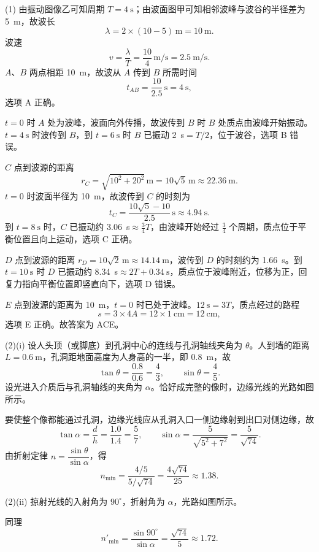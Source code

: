 \begin{answer}
(1) 由振动图像乙可知周期 $T=\SI{4}{\second}$；由波面图甲可知相邻波峰与波谷的半径差为 \SI{5}{\metre}，故波长
\[
  \lambda=2\times(10-5)\,\si{\metre}=\SI{10}{\metre}.
\]
波速
\[
  v=\frac{\lambda}{T}=\frac{10}{4}\,\si{\metre\per\second}=\SI{2.5}{\metre\per\second}.
\]
$A$、$B$ 两点相距 \SI{10}{\metre}，故波从 $A$ 传到 $B$ 所需时间
\[
  t_{AB}=\frac{10}{2.5}\,\si{\second}=\SI{4}{\second},
\]
选项 A 正确。

$t=0$ 时 $A$ 处为波峰，波面向外传播，故波传到 $B$ 时 $B$ 处质点由波峰开始振动。$t=\SI{4}{\second}$ 时波传到 $B$，到 $t=\SI{6}{\second}$ 时 $B$ 已振动 \SI{2}{\second}$=T/2$，位于波谷，选项 B 错误。

$C$ 点到波源的距离
\[
  r_{C}=\sqrt{10^{2}+20^{2}}\,\si{\metre}=10\sqrt{5}\,\si{\metre}\approx\SI{22.36}{\metre}.
\]
$t=0$ 时波面半径为 \SI{10}{\metre}，故波传到 $C$ 的时刻为
\[
  t_{C}=\frac{10\sqrt{5}-10}{2.5}\,\si{\second}\approx\SI{4.94}{\second}.
\]
到 $t=\SI{8}{\second}$ 时，$C$ 已振动约 \SI{3.06}{\second}$\approx\tfrac{3}{4}T$，由波峰开始经过 $\tfrac34$ 个周期，质点位于平衡位置且向上运动，选项 C 正确。

$D$ 点到波源的距离 $r_{D}=10\sqrt{2}\,\si{\metre}\approx\SI{14.14}{\metre}$，波传到 $D$ 的时刻约为 \SI{1.66}{\second}。到 $t=\SI{10}{\second}$ 时 $D$ 已振动约 \SI{8.34}{\second}$\approx2T+\SI{0.34}{\second}$，质点位于波峰附近，位移为正，回复力指向平衡位置即竖直向下，选项 D 错误。

$E$ 点到波源的距离为 \SI{10}{\metre}，$t=0$ 时已处于波峰。$\SI{12}{\second}=3T$，质点经过的路程
\[
  s=3\times4A=12\times\SI{1}{\centi\metre}=\SI{12}{\centi\metre},
\]
选项 E 正确。故答案为 ACE。

(2)(i) 设人头顶（或脚底）到孔洞中心的连线与孔洞轴线夹角为 $\theta$。人到墙的距离 $L=\SI{0.6}{\metre}$，孔洞距地面高度为人身高的一半，即 \SI{0.8}{\metre}，故
\[
  \tan\theta=\frac{0.8}{0.6}=\frac{4}{3},
  \qquad
  \sin\theta=\frac{4}{5}.
\]
设光进入介质后与孔洞轴线的夹角为 $\alpha$。恰好成完整的像时，边缘光线的光路如图所示。


要使整个像都能通过孔洞，边缘光线应从孔洞入口一侧边缘射到出口对侧边缘，故
\[
  \tan\alpha=\frac{d}{h}=\frac{1.0}{1.4}=\frac{5}{7},
  \qquad
  \sin\alpha=\frac{5}{\sqrt{5^{2}+7^{2}}}=\frac{5}{\sqrt{74}}.
\]
由折射定律 $n=\dfrac{\sin\theta}{\sin\alpha}$，得
\[
  n_{\min}=\frac{4/5}{5/\sqrt{74}}=\frac{4\sqrt{74}}{25}\approx1.38.
\]

(2)(ii) 掠射光线的入射角为 $90^{\circ}$，折射角为 $\alpha$，光路如图所示。


同理
\[
  n'_{\min}=\frac{\sin90^{\circ}}{\sin\alpha}=\frac{\sqrt{74}}{5}\approx1.72.
\]
\end{answer}
